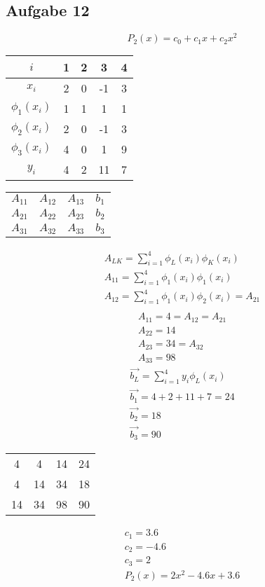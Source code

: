 \documentclass{article}
\begin{document}
\subsection*{Aufgabe 12}
\begin{equation*}
    P_2(x)=c_0+c_1x+c_2x^2
\end{equation*}
\begin{center}
    \begin{tabular}{c | c c c c}
        \hline
        $i$ & 1 & 2 & 3 & 4\\
        \hline
        $x_i$ & 2 &0&-1&3\\
        $\phi_1(x_i)$&1&1&1&1\\
        $\phi_2(x_i)$&2&0&-1&3\\
        $\phi_3(x_i)$&4&0&1&9\\
        $y_i$&4&2&11&7\\
        \hline
    \end{tabular}
\end{center}
\begin{center}
    \begin{tabular}{c c c | c}
        $A_{11}$&$A_{12}$&$A_{13}$&$b_1$\\
        $A_{21}$&$A_{22}$&$A_{23}$&$b_2$\\
        $A_{31}$&$A_{32}$&$A_{33}$&$b_3$\\
    \end{tabular}
\end{center}
\begin{eqnarray*}
    A_{LK}=\sum_{i=1}^{4} \phi_L(x_i)\phi_K(x_i)\\
    A_{11} = \sum_{i=1}^{4} \phi_1(x_i)\phi_1(x_i)\\
    A_{12}= \sum_{i=1}^{4} \phi_1(x_i)\phi_2(x_i) = A_21\\
\end{eqnarray*}
\begin{eqnarray*}
    A_{11} = 4 = A_{12} = A_{21}\\
    A_{22} = 14\\
    A_{23} =34 = A_{32}\\
    A_{33} = 98
\end{eqnarray*}
\begin{eqnarray*}
    \vec{b_L} = \sum_{i=1}^{4} y_i \phi_L(x_i)\\
    \vec{b_1} = 4+2+11+7 = 24\\
    \vec{b_2} = 18\\
    \vec{b_3} = 90
\end{eqnarray*}
\begin{center}
    \begin{tabular}{c c c | c}
        4&4&14&24\\
        4&14&34&18\\
        14&34&98&90\\
    \end{tabular}
\end{center}
\begin{eqnarray*}
    c_1 = 3.6\\
    c_2 = -4.6\\
    c_3 = 2\\
    P_2(x)=2x^2-4.6x+3.6
\end{eqnarray*}
\end{document}

